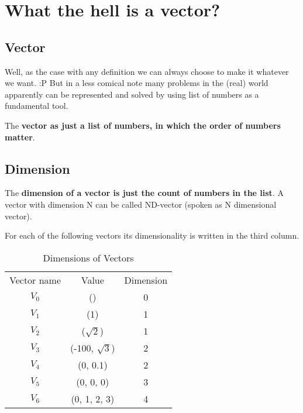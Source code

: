 \documentclass[../main.tex]{subfiles}
\begin{document}
\chapter{What the hell is a vector?}

\section{Vector}
Well, as the case with any definition we can always choose to make it whatever we want. :P
But in a less comical note many problems in the (real) world apparently can be represented and solved by using list of numbers as a fundamental tool.

\begin{definition}
The \textbf{vector as just a list of numbers, in which the order of numbers matter}.
\end{definition}

\section{Dimension}
\begin{definition}
The \textbf{dimension of a vector is just the count of numbers in the list}.
A vector with dimension N can be called ND-vector (spoken as N dimensional vector).
\end{definition}

For each of the following vectors its dimensionality is written in the third column.

\begin{table}[ht]
  \centering
  \begin{tabular}{ c  c  c }
    Vector name & Value & Dimension\\
    $ V_0 $ & () & 0\\
    $ V_1 $ & (1) & 1\\
    $ V_2 $ & ($\sqrt{2}$) & 1\\
    $ V_3 $ & (-100, $\sqrt{3}$) & 2\\
    $ V_4 $ & (0, 0.1) & 2\\
    $ V_5 $ & (0, 0, 0) & 3\\
    $ V_6 $ & (0, 1, 2, 3) & 4\\
  \end{tabular}
\caption{Dimensions of Vectors}
\label{tab:dim}
\end{table}
\end{document}

